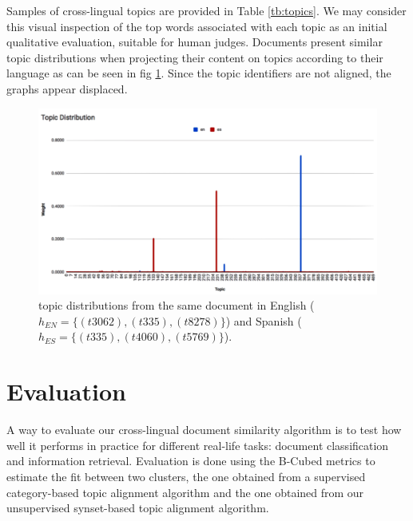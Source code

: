 Samples of cross-lingual topics are provided in Table \ref{tb:topics}. We may consider this visual inspection of the top words associated with each topic as an initial qualitative evaluation, suitable for human judges. Documents present similar topic distributions when projecting their content on topics according to their language as can be seen in fig \ref{fig:topic_distributions}. Since the topic identifiers are not aligned, the graphs appear displaced.

\begin{figure}[ht]\centering
\includegraphics[scale=0.4]{topic-dist.png}
\caption{topic distributions from the same document in English ($h_{EN}=\{(t3062),(t335),(t8278)\}$) and Spanish ($h_{ES}=\{(t335),(t4060),(t5769)\}$).}
\label{fig:topic_distributions}
\end{figure}



\section{Evaluation}
\label{sec:crosslingual-evaluation}

A way to evaluate our cross-lingual document similarity algorithm is to test how well it performs in practice for different real-life tasks: document classification and information retrieval. Evaluation is done using the B-Cubed metrics \citep{Bagga1998} to estimate the fit between two clusters, the one obtained from a supervised category-based topic alignment algorithm and the one obtained from our unsupervised synset-based topic alignment algorithm. 

